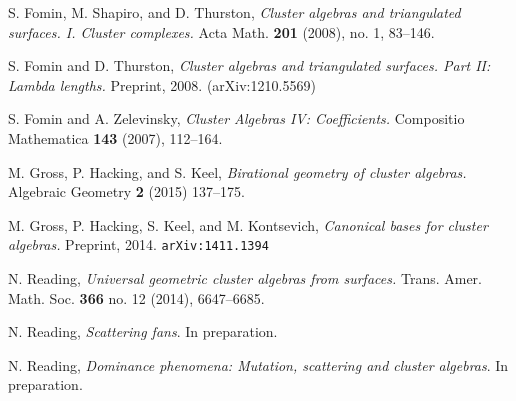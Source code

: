 \documentclass{amsart}
\theoremstyle{definition}
\theoremstyle{remark}
\numberwithin{equation}{section}
\newcommand{\0}{{\mathbf{0}}}
\begin{document}
\begin{thebibliography}{27}

S. Fomin, M. Shapiro, and D. Thurston,
\textit{Cluster algebras and triangulated surfaces. I. Cluster complexes.}
Acta Math. \textbf{201} (2008), no. 1, 83--146. 

S. Fomin and D. Thurston,
\textit{Cluster algebras and triangulated surfaces. Part II: Lambda lengths.}
Preprint, 2008.
(arXiv:1210.5569)

S. Fomin and A. Zelevinsky,
\textit{Cluster Algebras IV: Coefficients.}
Compositio Mathematica \textbf{143} (2007), 112--164.

M. Gross, P. Hacking, and S. Keel,
\textit{Birational geometry of cluster algebras.}
Algebraic Geometry \textbf{2} (2015) 137--175.

M. Gross, P. Hacking, S. Keel, and M. Kontsevich,
\textit{Canonical bases for cluster algebras.}
Preprint, 2014. \texttt{arXiv:1411.1394}

N. Reading,
\textit{Universal geometric cluster algebras from surfaces. }
Trans. Amer. Math. Soc. \textbf{366} no. 12 (2014), 6647--6685.

N. Reading, 
\textit{Scattering fans}. 
In preparation.

N. Reading, 
\textit{Dominance phenomena: Mutation, scattering and cluster algebras}. 
In preparation.

\end{thebibliography}
\end{document}
